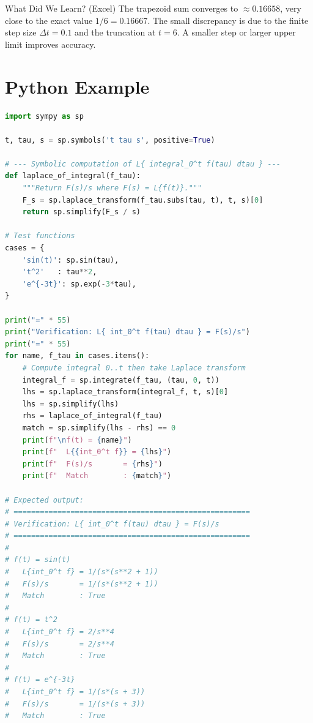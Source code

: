 \documentclass[12pt,a4paper]{article}
\begin{document}
\begin{learnbox}{What Did We Learn? (Excel)}
The trapezoid sum converges to $\approx 0.16658$, very close to the exact value
$1/6 = 0.16667$. The small discrepancy is due to the finite step size $\Delta t = 0.1$
and the truncation at $t = 6$. A smaller step or larger upper limit improves accuracy.
\end{learnbox}

\section{Python Example }

\begin{lstlisting}[language=Python, caption={Laplace Transform of Integrals --- Symbolic Verification}]
import sympy as sp

t, tau, s = sp.symbols('t tau s', positive=True)

# --- Symbolic computation of L{ integral_0^t f(tau) dtau } ---
def laplace_of_integral(f_tau):
    """Return F(s)/s where F(s) = L{f(t)}."""
    F_s = sp.laplace_transform(f_tau.subs(tau, t), t, s)[0]
    return sp.simplify(F_s / s)

# Test functions
cases = {
    'sin(t)': sp.sin(tau),
    't^2'   : tau**2,
    'e^{-3t}': sp.exp(-3*tau),
}

print("=" * 55)
print("Verification: L{ int_0^t f(tau) dtau } = F(s)/s")
print("=" * 55)
for name, f_tau in cases.items():
    # Compute integral 0..t then take Laplace transform
    integral_f = sp.integrate(f_tau, (tau, 0, t))
    lhs = sp.laplace_transform(integral_f, t, s)[0]
    lhs = sp.simplify(lhs)
    rhs = laplace_of_integral(f_tau)
    match = sp.simplify(lhs - rhs) == 0
    print(f"\nf(t) = {name}")
    print(f"  L{{int_0^t f}} = {lhs}")
    print(f"  F(s)/s       = {rhs}")
    print(f"  Match        : {match}")

# Expected output:
# ======================================================
# Verification: L{ int_0^t f(tau) dtau } = F(s)/s
# ======================================================
#
# f(t) = sin(t)
#   L{int_0^t f} = 1/(s*(s**2 + 1))
#   F(s)/s       = 1/(s*(s**2 + 1))
#   Match        : True
#
# f(t) = t^2
#   L{int_0^t f} = 2/s**4
#   F(s)/s       = 2/s**4
#   Match        : True
#
# f(t) = e^{-3t}
#   L{int_0^t f} = 1/(s*(s + 3))
#   F(s)/s       = 1/(s*(s + 3))
#   Match        : True


\end{lstlisting}
\end{document}

